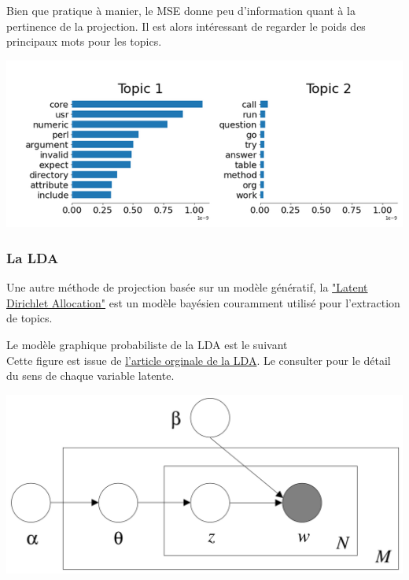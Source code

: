 \documentclass[a4paper,11pt]{article}
\begin{document}
Bien que pratique à manier, le MSE donne peu d'information quant à la pertinence de la projection. Il est alors intéressant de regarder le poids des principaux mots pour les topics. 

\begin{center}
    \includegraphics[width=0.8\linewidth]{illustrations/coprus_NMF_topics2.png}
\end{center}


\subsubsection*{La LDA}
Une autre méthode de projection basée sur un modèle génératif, la {\color{blue} \href{https://fr.wikipedia.org/wiki/Allocation_de_Dirichlet_latente}{"Latent Dirichlet Allocation"}} est un modèle bayésien couramment utilisé pour l'extraction de topics. \\


\begin{minipage}{0.5\linewidth}
    Le modèle graphique probabiliste de la LDA est le suivant\\
    Cette figure est issue de {\color{blue} \href{http://www.jmlr.org/papers/volume3/blei03a/blei03a.pdf}{l'article orginale de la LDA}}. Le consulter pour le détail du sens de chaque variable latente.
\end{minipage}
\hfill
\begin{minipage}{0.4\linewidth}
    \begin{center}
       \includegraphics[width=0.8\linewidth]{illustrations/PGM_LDA_original.png}
    \end{center}
\end{minipage}
\end{document}
